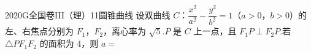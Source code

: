 
\begin{problem}{2020}{G}{全国卷III（理）}{11}{圆锥曲线}
设双曲线 $ C $：$ \dfrac{x^2}{a^2} - \dfrac{y^2}{b^2} = 1 $（$ a > 0 $，$ b > 0 $）的左、右焦点分别为 $ F_1 $，$ F_2 $，离心率为 $ \sqrt{5} $.$ P $ 是 $ C $ 上一点，且 $ F_1P \perp F_2P $.若 $ \triangle PF_1F_2 $ 的面积为 $ 4 $，则 $ a = $
\begin{choices}
\end{choices}
\end{problem}

\begin{answer}

\end{answer}

\begin{solutions}

\end{solutions}